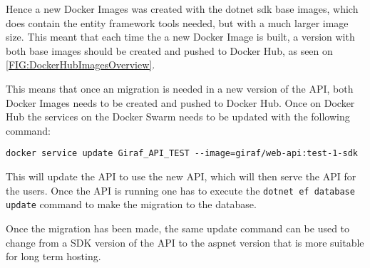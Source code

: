 Hence a new Docker Images was created with the dotnet sdk base images, which does contain the entity framework tools needed, but with a much larger image size. 
This meant that each time the a new Docker Image is built, a version with both base images should be created and pushed to Docker Hub, as seen on \autoref{FIG:DockerHubImagesOverview}. 


This means that once an migration is needed in a new version of the API, both Docker Images needs to be created and pushed to Docker Hub. 
Once on Docker Hub the services on the Docker Swarm needs to be updated with the following command:

\lstinline$docker service update Giraf_API_TEST --image=giraf/web-api:test-1-sdk$

This will update the API to use the new API, which will then serve the API for the users.
Once the API is running one has to execute the \lstinline$dotnet ef database update$ command to make the migration to the database.

Once the migration has been made, the same update command can be used to change from a SDK version of the API to the aspnet version that is more suitable for long term hosting.




